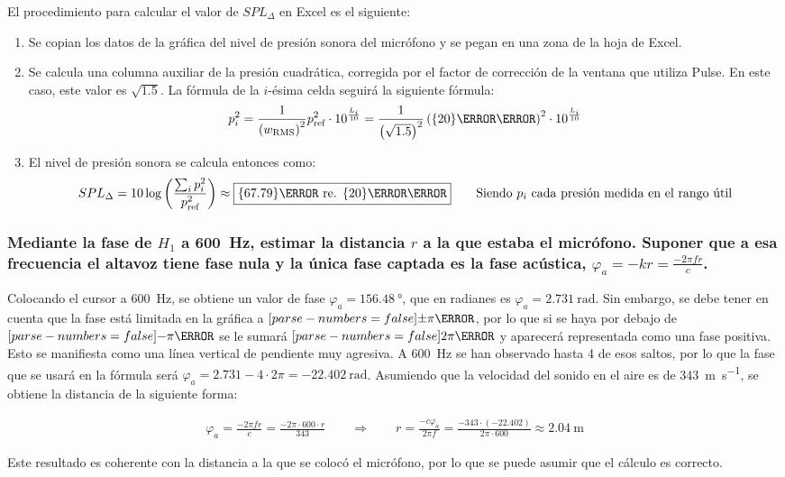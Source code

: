 \documentclass[10pt]{article}
\begin{document}
El procedimiento para calcular el valor de $SPL_{\Delta}$ en Excel es el siguiente:
\begin{enumerate}
  \item Se copian los datos de la gráfica del nivel de presión sonora del micrófono y se pegan en una zona de la hoja de Excel.
  \item Se calcula una columna auxiliar de la presión cuadrática, corregida por el factor de corrección de la ventana que utiliza Pulse. En este caso, este valor es $\sqrt{1.5}$. La fórmula de la $i$-ésima celda seguirá la siguiente fórmula:
        \[ p_i^2 = \frac{1}{\left( w _{\textnormal{RMS}} \right) ^2} p _{\textnormal{ref}} ^2 \cdot 10^{\frac{L_i}{10}} = \frac{1}{\left( \sqrt{1.5} \right) ^2} \left( \qty{20}{\micro\pascal} \right) ^2 \cdot 10^{\frac{L_i}{10}} \]
  \item El nivel de presión sonora se calcula entonces como:
        \[ SPL_{\Delta } = 10 \log \left( \frac{\sum _i p^2_i}{p _{\textnormal{ref}} ^2} \right) \approx \boxed{\qty{67.79}{\dB} \text{ re. } \qty{20}{\micro \pascal }} \qquad \text{Siendo }p_i \text{ cada presión medida en el rango útil}\]
\end{enumerate}

\subsubsection{\texorpdfstring{Mediante la fase de $H_1$ a \SI{600}{\Hz}, estimar la distancia $r$ a la que estaba el micrófono. Suponer que a esa frecuencia el altavoz tiene fase nula y la única fase captada es la fase acústica, $\varphi _a = -kr = \frac{-2\pi fr}{c}$.}{Pregunta 4}}

Colocando el cursor a \qty{600}{\hertz}, se obtiene un valor de fase $\varphi _a = \qty{156.48}{\degree}$, que en radianes es $\varphi _a = \qty{2.731}{\radian}$. Sin embargo, se debe tener en cuenta que la fase está limitada en la gráfica a $\qty[parse-numbers=false]{\pm\pi}{\radian}$, por lo que si se haya por debajo de $\qty[parse-numbers=false]{-\pi}{\radian}$ se le sumará $\qty[parse-numbers=false]{2\pi}{\radian}$ y aparecerá representada como una fase positiva. Esto se manifiesta como una línea vertical de pendiente muy agresiva. A \qty{600}{\hertz } se han observado hasta 4 de esos saltos, por lo que la fase que se usará en la fórmula será $\varphi _a = 2.731 - 4 \cdot 2\pi = \qty{-22.402}{\radian}$. Asumiendo que la velocidad del sonido en el aire es de \qty{343}{\metre \per \second}, se obtiene la distancia de la siguiente forma:

\begin{align*}
  \varphi _a = \frac{-2 \pi f r}{c} = \frac{-2 \pi \cdot  600 \cdot r}{343} \qquad \Longrightarrow \qquad r = \frac{- c \varphi _a}{2 \pi f} = \frac{-343 \cdot \left( -22.402 \right)}{2 \pi \cdot 600} \approx \boxed{\qty{2.04}{\meter}}
\end{align*}

Este resultado es coherente con la distancia a la que se colocó el micrófono, por lo que se puede asumir que el cálculo es correcto.
\end{document}
